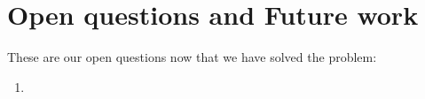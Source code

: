 \documentclass{article}
\begin{document}
\section{Open questions and Future work}
These are our open questions now that we have solved the problem:

\begin{enumerate}
	\item
\end{enumerate}








\end{document}
